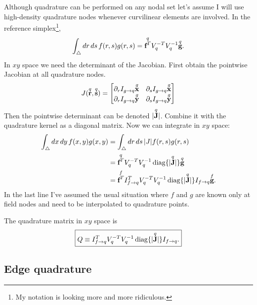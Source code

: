 Although quadrature can be performed on any nodal set let's assume I will use high-density quadrature nodes whenever curvilinear elements are involved.  In the reference simplex\footnote{My notation is looking more and more ridiculous.},
%
\begin{equation}
\int_\bigtriangleup dr\, ds\, f(r,s) g(r,s) = \overset{q}{\textbf{f}^T} V_q^{-T} V_q^{-1} \overset{q}{\textbf{g}}.
\end{equation}
%
In $xy$ space we need the determinant of the Jacobian.  First obtain the pointwise Jacobian at all quadrature nodes.
%
\begin{equation}
J(\overset{q}{\textbf{r}}, \overset{q}{\textbf{s}}) =
\begin{bmatrix}
\partial_r I_{g \rightarrow q} \overset{g}{\textbf{x}} & \partial_s I_{g \rightarrow q} \overset{g}{\textbf{x}} \\
\partial_r I_{g \rightarrow q} \overset{g}{\textbf{y}} & \partial_s I_{g \rightarrow q} \overset{g}{\textbf{y}}
\end{bmatrix}
\end{equation}
%
Then the pointwise determinant can be denoted $| \overset{q}{\textbf{J}} |$.  Combine it with the quadrature kernel as a diagonal matrix.  Now we can integrate in $xy$ space:
%
\begin{equation}
\begin{aligned}
\int_\bigtriangleup dx \, dy \, f(x,y) g(x,y) &= \int_\bigtriangleup dr \, ds \, |J| f(r,s) g(r,s) \\
&= \overset{q}{\textbf{f}^T} V_q^{-T} V_q^{-1} \operatorname{diag}\{| \overset{q}{\textbf{J}}|\} \overset{q}{\textbf{g}} \\
&= \overset{f}{\textbf{f}^T} I_{f \rightarrow q}^T V_q^{-T} V_q^{-1} \operatorname{diag}\{| \overset{q}{\textbf{J}}|\} I_{f \rightarrow q} \overset{f}{\textbf{g}}.
\end{aligned}
\end{equation}
%
In the last line I've assumed the usual situation where $f$ and $g$ are known only at field nodes and need to be interpolated to quadrature points.

The quadrature matrix in $xy$ space is
%
\begin{equation}
\boxed{
Q \equiv I_{f \rightarrow q}^T V_q^{-T} V_q^{-1} \operatorname{diag}\{| \q{\ve J}|\} I_{f \rightarrow q}.
}%
\end{equation}

\subsection{Edge quadrature}

